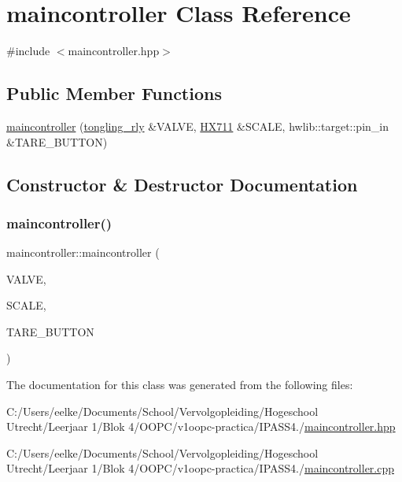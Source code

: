 \hypertarget{classmaincontroller}{}\section{maincontroller Class Reference}
\label{classmaincontroller}


{\ttfamily \#include $<$maincontroller.\+hpp$>$}

\subsection*{Public Member Functions}
\begin{DoxyCompactItemize}
\item 
\hyperlink{classmaincontroller_a72d857fa29469b1a2a79c2c3ef4b7675}{maincontroller} (\hyperlink{classtongling__rly}{tongling\+\_\+rly} \&V\+A\+L\+VE, \hyperlink{class_h_x711}{H\+X711} \&S\+C\+A\+LE, hwlib\+::target\+::pin\+\_\+in \&T\+A\+R\+E\+\_\+\+B\+U\+T\+T\+ON)
\end{DoxyCompactItemize}


\subsection{Constructor \& Destructor Documentation}
\mbox{\label{classmaincontroller_a72d857fa29469b1a2a79c2c3ef4b7675}} 
\subsubsection{\texorpdfstring{maincontroller()}{maincontroller()}}
{\footnotesize\ttfamily maincontroller\+::maincontroller (\begin{DoxyParamCaption}\item[{\hyperlink{classtongling__rly}{tongling\+\_\+rly} \&}]{V\+A\+L\+VE,  }\item[{\hyperlink{class_h_x711}{H\+X711} \&}]{S\+C\+A\+LE,  }\item[{hwlib\+::target\+::pin\+\_\+in \&}]{T\+A\+R\+E\+\_\+\+B\+U\+T\+T\+ON }\end{DoxyParamCaption})\hspace{0.3cm}{\ttfamily [inline]}}



The documentation for this class was generated from the following files\+:\begin{DoxyCompactItemize}
\item 
C\+:/\+Users/eelke/\+Documents/\+School/\+Vervolgopleiding/\+Hogeschool Utrecht/\+Leerjaar 1/\+Blok 4/\+O\+O\+P\+C/v1oopc-\/practica/\+I\+P\+A\+S\+S4./\hyperlink{maincontroller_8hpp}{maincontroller.\+hpp}\item 
C\+:/\+Users/eelke/\+Documents/\+School/\+Vervolgopleiding/\+Hogeschool Utrecht/\+Leerjaar 1/\+Blok 4/\+O\+O\+P\+C/v1oopc-\/practica/\+I\+P\+A\+S\+S4./\hyperlink{maincontroller_8cpp}{maincontroller.\+cpp}\end{DoxyCompactItemize}

